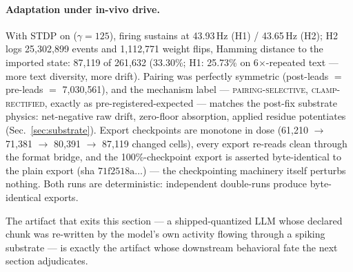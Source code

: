 \paragraph{Adaptation under in-vivo drive.}
With STDP on ($\gamma=125$), firing sustains at 43.93\,Hz (H1) /
43.65\,Hz (H2); H2 logs 25{,}302{,}899 events and 1{,}112{,}771 weight
flips, Hamming distance to the imported state: 87{,}119 of 261{,}632
(33.30\%; H1: 25.73\% on 6$\times$-repeated text ---
more text diversity, more drift). Pairing was perfectly symmetric
(post-leads $=$ pre-leads $=$ 7{,}030{,}561), and the mechanism label
--- \textsc{pairing-selective, clamp-rectified}, exactly as
pre-registered-expected --- matches the post-fix substrate physics:
net-negative raw drift, zero-floor absorption, applied residue
potentiates (Sec.~\ref{sec:substrate}). Export checkpoints are
monotone in dose (61{,}210 $\to$ 71{,}381 $\to$ 80{,}391 $\to$ 87{,}119
changed cells), every export re-reads clean through the format bridge,
and the 100\%-checkpoint export is asserted byte-identical to the plain
export (sha $71\mathrm{f}2518\mathrm{a}\ldots$) --- the checkpointing
machinery itself perturbs nothing. Both runs are deterministic:
independent double-runs produce byte-identical exports.

The artifact that exits this section --- a shipped-quantized LLM whose
declared chunk was re-written by the model's own activity flowing
through a spiking substrate --- is exactly the artifact whose
downstream behavioral fate the next section adjudicates.
